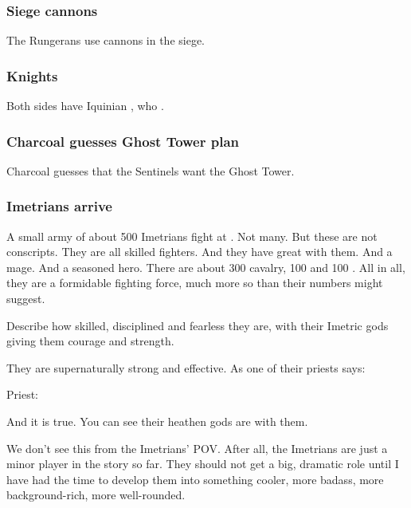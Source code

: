 \subsubsection{Siege cannons}
The Rungerans use cannons in the siege. 





\subsubsection{Knights}
Both sides have Iquinian , who .





\subsubsection{Charcoal guesses Ghost Tower plan}
Charcoal guesses that the Sentinels want the Ghost Tower.





\subsubsection{Imetrians arrive}
A small army of about 500 Imetrians fight at \Forclin. 
Not many. 
But these are not conscripts.
They are all skilled fighters.
And they have great \saurians with them. 
And a mage.
And a seasoned hero.
There are about 300 cavalry, 100 \nycaneers and 100 \nycans. 
All in all, they are a formidable fighting force, much more so than their numbers might suggest. 

Describe how skilled, disciplined and fearless they are, with their Imetric gods giving them courage and strength. 

They are supernaturally strong and effective.
As one of their priests says: 

\begin{prose}
  Priest: 
\end{prose}

And it is true. 
You can see their heathen gods are with them. 

We don't see this from the Imetrians' POV. 
After all, the Imetrians are just a minor player in the story so far. 
They should not get a big, dramatic role until I have had the time to develop them into something cooler, more badass, more background-rich, more well-rounded. 

